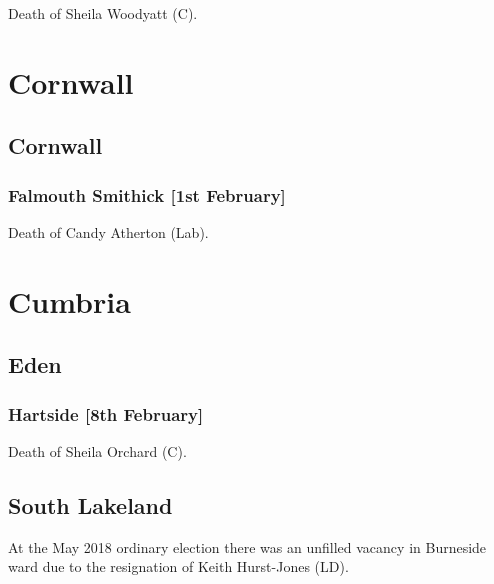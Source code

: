 \documentclass[a4paper,openany]{book}
\begin{document}
\begin{resultsiii}

Death of Sheila Woodyatt (C).

\section{Cornwall}

\subsection*{Cornwall}

\subsubsection*{Falmouth Smithick \hspace*{\fill}\nolinebreak[1]%
\enspace\hspace*{\fill}
[1st February]}


Death of Candy Atherton (Lab).

\section{Cumbria}

\subsection*{Eden}

\subsubsection*{Hartside \hspace*{\fill}\nolinebreak[1]%
\enspace\hspace*{\fill}
[8th February]}


Death of Sheila Orchard (C).

\subsection*{South Lakeland}

At the May 2018 ordinary election there was an unfilled vacancy in Burneside ward due to the resignation of Keith Hurst-Jones (LD).


\end{resultsiii}
\end{document}
